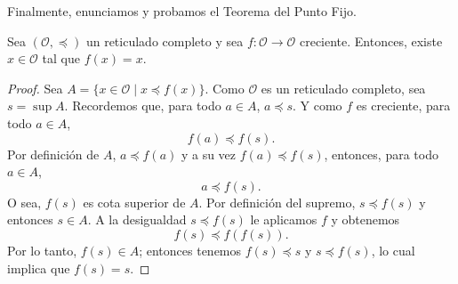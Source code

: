 Finalmente, enunciamos y probamos el Teorema del Punto Fijo.

\begin{theorem}
	Sea $(\mathcal{O}, \preceq)$ un reticulado completo y sea $f: \mathcal{O} \to  \mathcal{O}$ creciente. Entonces, existe $x \in \mathcal{O}$ tal que $f(x)= x$.
\end{theorem}

\begin{proof}
	Sea $A = \{ x \in \mathcal{O} \mid x \preceq f(x) \}$. Como $\mathcal{O}$ es un reticulado completo, sea $s = \sup A$. Recordemos que, para todo $a \in A$, $a \preceq s$. Y como $f$ es creciente, para todo $a \in A$,
	\begin{equation*}
		f(a) \preceq f(s).
	\end{equation*}
	Por definición de $A$, $a \preceq f(a)$ y a su vez $f(a) \preceq f(s)$, entonces, para todo $a \in A$,
	\begin{equation*}
		a \preceq f(s).
	\end{equation*}
	O sea, $f(s)$ es cota superior de $A$. Por definición del supremo, $s \preceq f(s)$ y entonces $s \in A$. A la desigualdad $s \preceq f(s)$ le aplicamos $f$ y obtenemos
	\begin{equation*}
		f(s) \preceq f(f(s)).
	\end{equation*}
	Por lo tanto, $f(s) \in A$; entonces tenemos $f(s) \preceq s$ y $s \preceq f(s)$, lo cual implica que $f(s) = s$.
\end{proof}